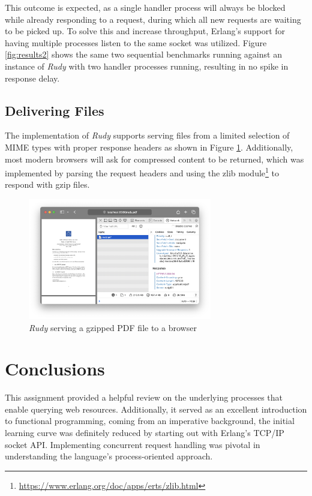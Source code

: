 \documentclass[a4paper, 11pt]{article}
\begin{document}
This outcome is expected, as a single handler process will always be blocked while already responding to a request, during which all new requests are waiting to be picked up.
To solve this and increase throughput, Erlang's support for having multiple processes listen to the same socket was utilized.
Figure \ref{fig:results2} shows the same two sequential benchmarks running against an instance of \textit{Rudy} with two handler processes running, resulting in no spike in response delay.

\subsection{Delivering Files}
The implementation of \textit{Rudy} supports serving files from a limited selection of MIME types with proper response headers as shown in Figure \ref{fig:browser1}. Additionally, most modern browsers will ask for compressed content to be returned, which was implemented by parsing the request headers and using the zlib module\footnote{\url{https://www.erlang.org/doc/apps/erts/zlib.html}} to respond with gzip files. 
\begin{figure}[H]
  \begin{center}
    \includegraphics[height=200px]{graphs/browser/pdf-gzip.png}
    \caption{\textit{Rudy} serving a gzipped PDF file to a browser}
    \label{fig:browser1}
  \end{center}
\end{figure}

\section{Conclusions}

This assignment provided a helpful review on the underlying processes that enable querying web resources.
Additionally, it served as an excellent introduction to functional programming, coming from an imperative background, the initial learning curve was definitely reduced by starting out with Erlang's TCP/IP socket API.
Implementing concurrent request handling was pivotal in understanding the language's process-oriented approach.
\end{document}
